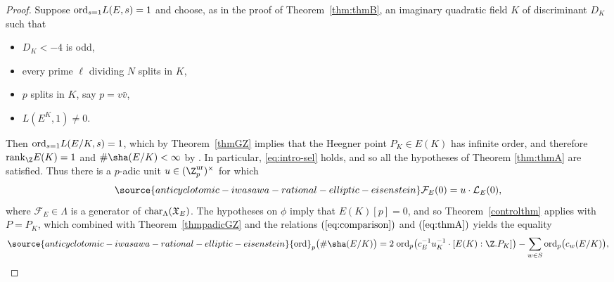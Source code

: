 \begin{proof}
Suppose ${\rm ord}_{s=1}L(E,s)=1$ and choose, as in the proof of Theorem~\ref{thm:thmB}, an imaginary quadratic field $K$ of discriminant $D_K$ such that
\begin{itemize}
\item[(a)] $D_K<-4$ is odd,
\item[(b)] every prime $\ell$ dividing $N$ splits in $K$,
\item[(c)] $p$ splits in $K$, say $p=v\bar{v}$,
\item[(d)] $L(E^K,1)\neq 0$.
\end{itemize}
Then ${\rm ord}_{s=1}L(E/K,s)=1$, which by Theorem~\ref{thmGZ} implies that the Heegner point $P_K\in E(K)$ has infinite order, and therefore ${\rm rank}_\Z E(K)=1$ and $\#\sha(E/K)<\infty$ by \cite{kolyvagin-mw-sha}.
In particular, \eqref{eq:intro-sel} holds, and so all the hypotheses of Theorem \ref{thm:thmA} are satisfied. Thus there is a $p$-adic unit $u\in(\Z_p^{{\rm ur}})^\times$ for which
\begin{equation}\label{eq:thmA}
\source{anticyclotomic-iwasawa-rational-elliptic-eisenstein}
\mathcal{F}_E(0)=u\cdot\mathcal{L}_E(0),
\end{equation}
where $\mathcal{F}_E\in\Lambda$ is a generator of ${\rm char}_\Lambda(\mathfrak{X}_E)$. The hypotheses on $\phi$ imply that $E(K)[p]=0$, and so Theorem~\ref{controlthm} applies with $P=P_K$, which combined with Theorem~\ref{thmpadicGZ} and the relations $(\ref{eq:comparison})$ and $(\ref{eq:thmA})$
yields the equality
\begin{equation}\label{eq:thmA-bis}
\source{anticyclotomic-iwasawa-rational-elliptic-eisenstein}
{\rm ord}_p\bigl(\#\sha(E/K)\bigr)=2\;{\rm ord}_p\bigl(c_E^{-1}u_K^{-1}\cdot[E(K):\Z.P_K]\bigr)-\sum_{w\in S}{\rm ord}_p\bigl(c_w(E/K)\bigr),
\end{equation}


\end{proof}

